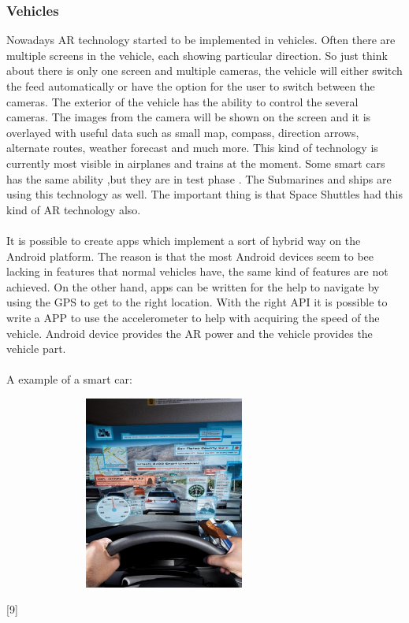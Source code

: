 \subsubsection{Vehicles}
Nowadays AR technology started to be implemented in vehicles. Often there are multiple screens in the vehicle, each showing particular direction. So just think about there is only one screen and multiple cameras, the vehicle will either switch the feed automatically or have the option for the user to switch  between the cameras. The exterior of the vehicle has the ability to control the several cameras. The images from the camera will be shown on the screen and it is overlayed with useful data such as small map, compass, direction arrows, alternate routes, weather forecast and much more. This kind of technology is currently most visible in airplanes and trains at the moment. Some smart cars has the same ability ,but they are in test phase . The Submarines and ships are using this technology as well. The important thing is that Space Shuttles had this kind of AR technology also.
\\
\\
It is possible to create apps which implement a sort of hybrid way on the Android platform. The reason is that the most Android devices seem to bee lacking in features that normal vehicles have, the same kind of features are not achieved. On the other hand, apps can be written for the help to navigate by using the GPS to get to the right location.  With the right API it is possible to write a APP to use the accelerometer to help with  acquiring the speed of the vehicle. Android device provides the AR power and the vehicle  provides the vehicle part.
\\
\\
A example of a smart car:
\begin{figure}[H]
\centering
\includegraphics[width=240pt,height=180pt,keepaspectratio]{graphics/smartcar.png}
\caption{\cite{javaObjectClass}}
\end{figure}
[9]
